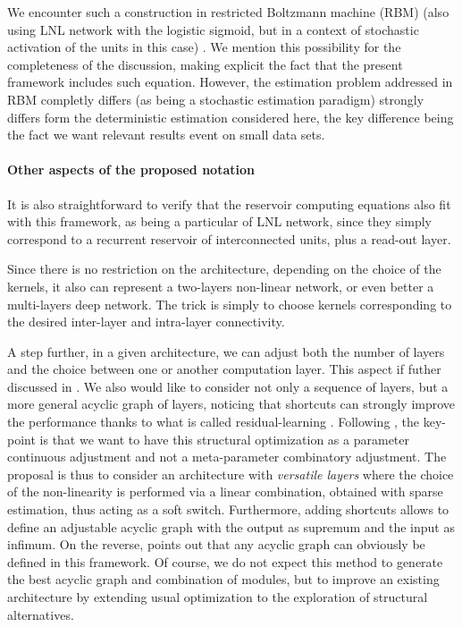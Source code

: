 We encounter such a construction in restricted Boltzmann machine (RBM) (also using LNL network with the logistic sigmoid, but in a context of stochastic activation of the units in this case) \cite{Bengio:2009}. We mention this possibility for the completeness of the discussion, making explicit the fact that the present framework includes such equation. However, the estimation problem addressed in RBM completly differs (as being a stochastic estimation paradigm) strongly differs form the deterministic estimation considered here, the key difference being the fact we want relevant results event on small data sets.

\paragraph{Other aspects of the proposed notation} 

It is also straightforward to verify that the reservoir computing equations \cite{verstraeten-etal:07} also fit with this framework, as being a particular of LNL network, since they simply correspond to a recurrent reservoir of interconnected units, plus a read-out layer.

Since there is no restriction on the architecture, depending on the choice of the kernels, it also can represent a two-layers non-linear network, or even better a multi-layers deep network. The trick is simply to choose kernels corresponding to the desired inter-layer and intra-layer connectivity.

A step further, in a given architecture, we can adjust both the number of layers and the choice between one or another computation layer. This aspect if futher discussed in \cite{Drumond2017From}. We also would like to consider not only a sequence of layers, but a more general acyclic graph of layers, noticing that shortcuts can strongly improve the performance thanks to what is called residual-learning \cite{He2016Deep}. Following \cite{Fdrumond2017}, the key-point is that we want to have this structural optimization as a parameter continuous adjustment and not a meta-parameter combinatory adjustment. The proposal is thus to consider an architecture with {\em versatile layers} where the choice of the non-linearity is performed via a linear combination, obtained with sparse estimation, thus acting as a soft switch. Furthermore, adding shortcuts allows to define an adjustable acyclic graph with the output as supremum and the input as infimum. On the reverse, \cite{Fdrumond2017} points out that any acyclic graph can obviously be defined in this framework. Of course, we do not expect this method to generate the best acyclic graph and combination of modules, but to improve an existing architecture by extending usual optimization to the exploration of structural alternatives.

